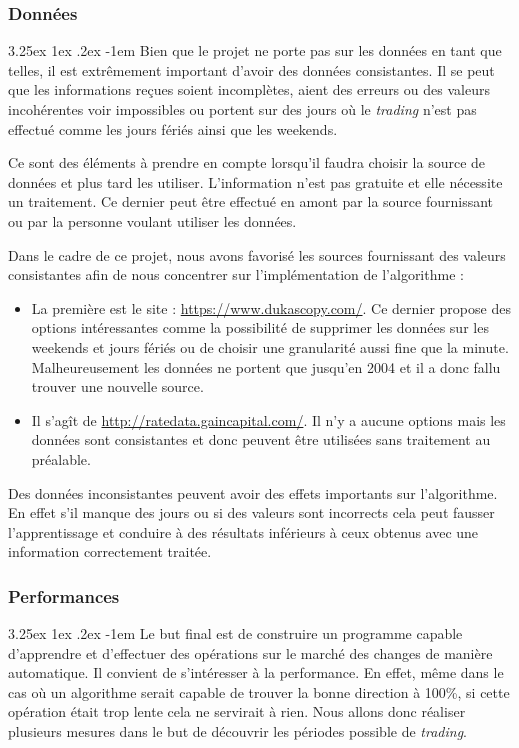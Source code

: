 \documentclass[a4paper, 11pt]{article}
\makeatletter
\renewcommand\paragraph{\@startsection{paragraph}{5}{\z@}%
  {3.25ex \@plus1ex \@minus.2ex}%
  {-1em}%
  {\normalfont\normalsize\bfseries}}
\makeatother
\begin{document}
\subsubsection{Données}

\paragraph{}
Bien que le projet ne porte pas sur les données en tant que telles, il est extrêmement important d'avoir des données consistantes. Il se peut que les informations reçues soient incomplètes, aient des erreurs ou des valeurs incohérentes voir impossibles ou portent sur des jours où le \textit{trading} n'est pas effectué comme les jours fériés ainsi que les weekends.

Ce sont des éléments à prendre en compte lorsqu'il faudra choisir la source de données et plus tard les utiliser. L'information n'est pas gratuite et elle nécessite un traitement. Ce dernier peut être effectué en amont par la source fournissant ou par la personne voulant utiliser les données.

Dans le cadre de ce projet, nous avons favorisé les sources fournissant des valeurs consistantes afin de nous concentrer sur l'implémentation de l'algorithme :
\begin{itemize}
	\item La première est le site : \url{https://www.dukascopy.com/}. Ce dernier propose des options intéressantes comme la possibilité de supprimer les données sur les weekends et jours fériés ou de choisir une granularité aussi fine que la minute. Malheureusement les données ne portent que jusqu'en 2004 et il a donc fallu trouver une nouvelle source.
	\item Il s'agît de \url{http://ratedata.gaincapital.com/}. Il n'y a aucune options mais les données sont consistantes et donc peuvent être utilisées sans traitement au préalable.
\end{itemize}

Des données inconsistantes peuvent avoir des effets importants sur l'algorithme. En effet s'il manque des jours ou si des valeurs sont incorrects cela peut fausser l'apprentissage et conduire à des résultats inférieurs à ceux obtenus avec une information correctement traitée.

\subsubsection{Performances}
\paragraph{}
Le but final est de construire un programme capable d'apprendre et d'effectuer des opérations sur le marché des changes de manière automatique. Il convient de s'intéresser à la performance. En effet, même dans le cas où un algorithme serait capable de trouver la bonne direction à 100\%, si cette opération était trop lente cela ne servirait à rien. Nous allons donc réaliser plusieurs mesures dans le but de découvrir les périodes possible de \textit{trading}.
\end{document}
